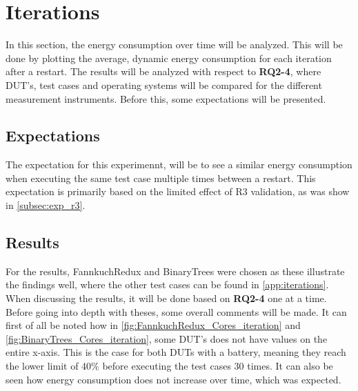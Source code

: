 \section{Iterations}\label{sec:iterations}

In this section, the energy consumption over time will be analyzed. This will be done by plotting the average, dynamic energy consumption for each iteration after a restart. The results will be analyzed with respect to \textbf{RQ2-4}, where DUT's, test cases and operating systems will be compared for the different measurement instruments. Before this, some expectations will be presented.

\subsection{Expectations}

The expectation for this experimennt, will be to see a similar energy consumption when executing the same test case multiple times between a restart. This expectation is primarily based on the limited effect of R3 validation, as was show in \cref*{subsec:exp_r3}.

\subsection{Results}

For the results, FannkuchRedux and BinaryTrees were chosen as these illustrate the findings well, where the other test cases can be found in \cref{app:iterations}. When discussing the results, it will be done based on \textbf{RQ2-4} one at a time. Before going into depth with theses, some overall comments will be made. It can first of all be noted how in \cref{fig:FannkuchRedux_Cores_iteration} and \cref{fig:BinaryTrees_Cores_iteration}, some DUT's does not have values on the entire x-axis. This is the case for both DUTs with a battery, meaning they reach the lower limit of 40\% before executing the test cases 30 times. It can also be seen how energy consumption does not increase over time, which was expected. 



